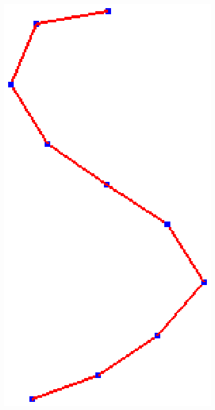 \begin{figure} [htbp]
{\begin{minipage}[b]{0.2\textwidth}
      \includegraphics[scale=0.3]{figs/f3.strokepre-3.eps}
    \end{minipage}}
  \subfigure[]{
    \centering
    \label{fig:alstrokeproc:d}
    \begin{minipage}[b]{0.2\textwidth}
      \centering

\end{minipage}}
\end{figure}
